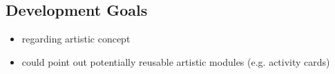 \subsection{Development Goals}

\begin{itemize}
    \item regarding artistic concept
    \item could point out potentially reusable artistic modules (e.g. activity cards)
\end{itemize}

